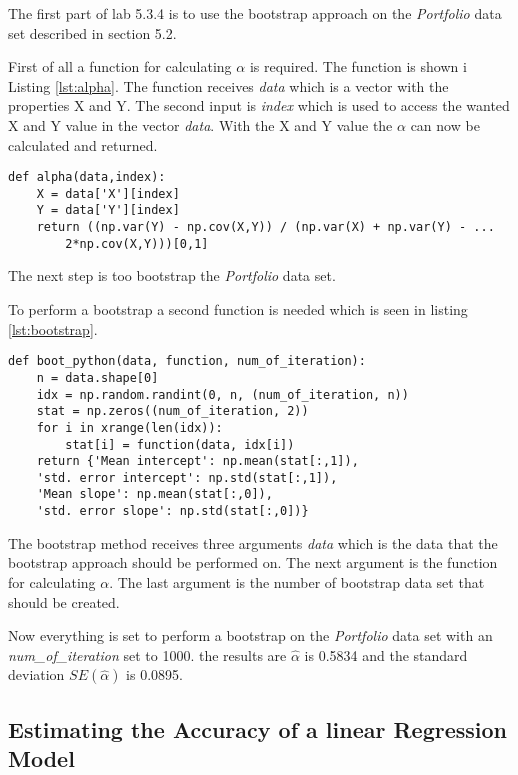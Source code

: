 The first part of lab 5.3.4 is to use the bootstrap approach on the \emph{Portfolio} data set described in section 5.2\citep{ISLR}.

First of all a function for calculating $\alpha$ is required. The function is shown i Listing \ref{lst:alpha}. The function receives \emph{data} which is a vector with the properties X and Y. The second input is \emph{index} which is used to access the wanted X and Y value in the vector \emph{data}.
With the X and Y value the $\alpha$ can now be calculated and returned.

\begin{lstlisting}[caption={Function for calculating $\alpha$ in python}, label=lst:alpha, mathescape=true]
def alpha(data,index):
	X = data['X'][index]
	Y = data['Y'][index]
	return ((np.var(Y) - np.cov(X,Y)) / (np.var(X) + np.var(Y) - ...
		2*np.cov(X,Y)))[0,1]
\end{lstlisting}

The next step is too bootstrap the \emph{Portfolio} data set.

To perform a bootstrap a second function is needed which is seen in listing \ref{lst:bootstrap}.

\begin{lstlisting}[caption={Bootstrap function in python}, label=lst:bootstrap, mathescape=true]
def boot_python(data, function, num_of_iteration):
	n = data.shape[0]
	idx = np.random.randint(0, n, (num_of_iteration, n))
	stat = np.zeros((num_of_iteration, 2))
	for i in xrange(len(idx)):
		stat[i] = function(data, idx[i])
	return {'Mean intercept': np.mean(stat[:,1]), 
	'std. error intercept': np.std(stat[:,1]), 
	'Mean slope': np.mean(stat[:,0]), 
	'std. error slope': np.std(stat[:,0])}
\end{lstlisting}

The bootstrap method receives three arguments \emph{data} which is the data that the bootstrap approach should be performed on. The next argument is the function for calculating $\alpha$. The last argument is the number of bootstrap data set that should be created.  

Now everything is set to perform a bootstrap on the \emph{Portfolio} data set with an \emph{num\_of\_iteration} set to 1000. the results are $\hat{\alpha}$ is 0.5834 and the standard deviation $SE(\hat{\alpha})$ is 0.0895.

\subsection{Estimating the Accuracy of a linear Regression Model}